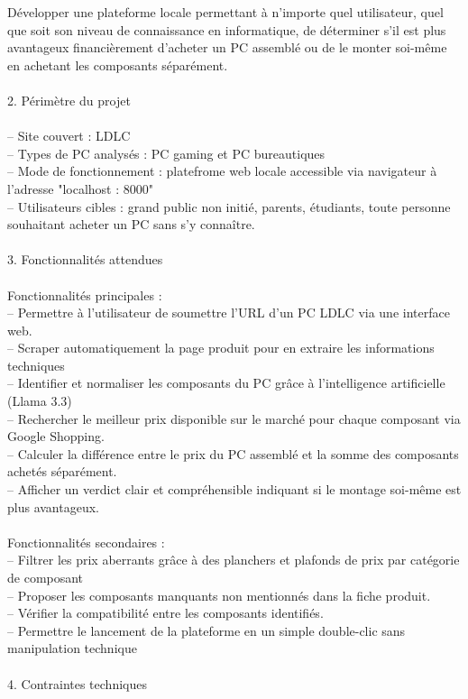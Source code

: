 \documentclass[a4paper, 12pt, twoside]{article}
\begin{document}
Développer une plateforme locale permettant à n'importe quel utilisateur, quel que soit son niveau de connaissance en informatique, de déterminer s'il est plus avantageux financièrement d'acheter un PC assemblé ou de le monter soi-même en achetant les composants séparément.\\
\\
2. Périmètre du projet\\
\\
– Site couvert : LDLC\\
– Types de PC analysés : PC gaming et PC bureautiques\\
– Mode de fonctionnement : platefrome web locale accessible via navigateur à l'adresse "localhost : 8000"\\
– Utilisateurs cibles : grand public non initié, parents, étudiants, toute personne souhaitant acheter un PC sans s'y connaître.\\
\\
3. Fonctionnalités attendues\\
\\
Fonctionnalités principales :\\
– Permettre à l'utilisateur de soumettre l'URL d'un PC LDLC via une interface web.\\
– Scraper automatiquement la page produit pour en extraire les informations techniques\\
– Identifier et normaliser les composants du PC grâce à l'intelligence artificielle (Llama 3.3)\\
– Rechercher le meilleur prix disponible sur le marché pour chaque composant via Google Shopping.\\
– Calculer la différence entre le prix du PC assemblé et la somme des composants achetés séparément.\\
– Afficher un verdict clair et compréhensible indiquant si le montage soi-même est plus avantageux.\\
\\
Fonctionnalités secondaires :\\
– Filtrer les prix aberrants grâce à des planchers et plafonds de prix par catégorie de composant\\
– Proposer les composants manquants non mentionnés dans la fiche produit.\\
– Vérifier la compatibilité entre les composants identifiés.\\
– Permettre le lancement de la plateforme en un simple double-clic sans manipulation technique\\
\\
4. Contraintes techniques\\
\end{document}
